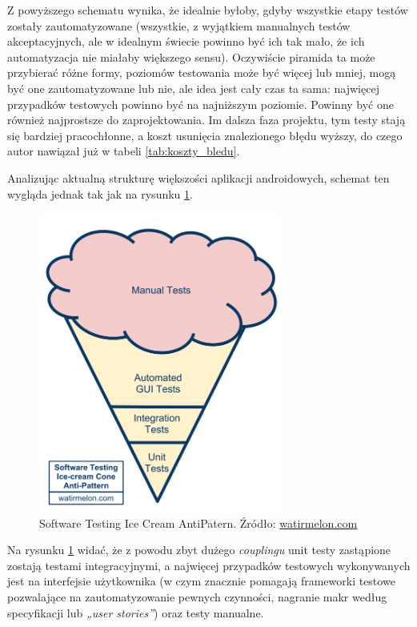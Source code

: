 Z powyższego schematu wynika, że idealnie byłoby, gdyby wszystkie etapy testów zostały zautomatyzowane (wszystkie, z wyjątkiem manualnych testów akceptacyjnych, ale w idealnym świecie powinno być ich tak mało, że ich automatyzacja nie miałaby większego sensu). Oczywiście piramida ta może przybierać różne formy, poziomów testowania może być więcej lub mniej, mogą być one zautomatyzowane lub nie, ale idea jest cały czas ta sama: najwięcej przypadków testowych powinno być na najniższym poziomie. Powinny być one również najprostsze do zaprojektowania. Im dalsza faza projektu, tym testy stają się bardziej pracochłonne, a koszt usunięcia znalezionego błędu wyższy, do czego autor nawiązał już w tabeli \ref{tab:koszty_bledu}.

Analizując aktualną strukturę większości aplikacji androidowych, schemat ten wygląda jednak tak jak na rysunku \ref{fig:odwrocona_piramida}.

\begin{figure}[!htb]
    \centering
    \includegraphics[width=8cm]{imgs/ch3_odwrocona_piramida.png}
    \caption
{Software Testing Ice Cream AntiPatern. Źródło: \url{watirmelon.com}}
    \label{fig:odwrocona_piramida}
\end{figure} 

Na rysunku \ref{fig:odwrocona_piramida} widać, że z powodu zbyt dużego \textit{couplingu} unit testy zastąpione zostają testami integracyjnymi, a najwięcej przypadków testowych wykonywanych jest na interfejsie użytkownika (w czym znacznie pomagają frameworki testowe pozwalające na zautomatyzowanie pewnych czynności, nagranie makr według specyfikacji lub \textit{„user stories”}) oraz testy manualne.

